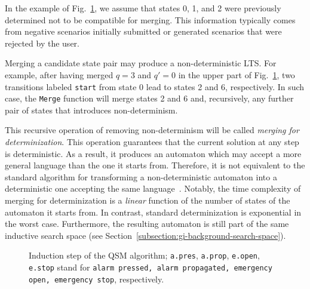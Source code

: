 \begin{description}
In the example of Fig.~\ref{Fig:algo:steps}, we assume that states 0, 1, and 2 were previously determined not to be compatible for merging. This information typically comes from negative scenarios initially submitted or generated scenarios that were rejected by the user. 

Merging a candidate state pair may produce a non-deterministic LTS. For example, after having merged $q = 3$ and $q' = 0$ in the upper part of Fig.~\ref{Fig:algo:steps}, two transitions labeled \texttt{start} from state 0 lead to states 2 and 6, respectively. In such case, the \texttt{Merge} function will merge states 2 and 6 and, recursively, any further pair of states that introduces non-determinism. 

This recursive operation of removing non-determinism will be called \textsl{merging for determinization}. This operation guarantees that the current solution at any step is deterministic. As a result, it produces an automaton which may accept a more general language than the one it starts from. Therefore, it is not equivalent to the standard algorithm for transforming a non-deterministic automaton into a deterministic one accepting the same language~\cite{Hopcroft:1979}. Notably, the time complexity of merging for determinization is a \emph{linear} function of the number of states of the automaton it starts from. In contrast, standard determinization is exponential in the worst case. Furthermore, the resulting automaton is still part of the same inductive search space (see Section~\ref{subsection:gi-background-search-space}). 

\begin{figure}[H]
\centering
{}
\caption{Induction step of the \textsc{QSM} algorithm; \texttt{a.pres}, \texttt{a.prop}, \texttt{e.open}, \texttt{e.stop} stand for \texttt{alarm pressed, alarm propagated, emergency open, emergency stop}, respectively.\label{Fig:algo:steps}}
\end{figure}


\end{description}

